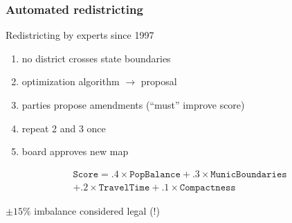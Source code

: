 \documentclass[xcolor=dvipsnames]{beamer}  %
\begin{document}
\begin{frame}                      %

    \frametitle{Automated redistricting}

Redistricting by experts since 1997

\begin{enumerate}
\item no district crosses state boundaries
\item optimization algorithm $\rightarrow$ proposal
\item parties propose amendments (``must'' improve score)
\item repeat 2 and 3 once
\item board approves new map
\end{enumerate}

\begin{multline*}
\texttt{Score} = .4 \times \texttt{PopBalance} + .3 \times \texttt{MunicBoundaries} \\
+ .2 \times \texttt{TravelTime} + .1 \times \texttt{Compactness}
\end{multline*}


$\pm15\%$ imbalance considered legal (!)


\end{frame}









\end{document}

